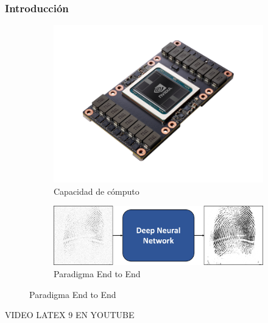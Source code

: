 \documentclass{beamer}
\begin{document}
\begin{frame}
\frametitle{Introducción}


\begin{figure}[h]

\begin{subfigure}{0.4\linewidth}
  \centering
  \includegraphics[width=\linewidth]{figs/nvidia_card.png}
  \caption{Capacidad de cómputo}
  \label{fig:sub-first}
\end{subfigure}
\begin{subfigure}{0.8\linewidth}
  \centering
  \includegraphics[width=\linewidth]{figs/end_to_end.png}
  \caption{Paradigma End to End}
  \label{fig:sub-second}
\end{subfigure}

\label{fig:fig}
\end{figure}

VIDEO LATEX 9 EN YOUTUBE

\end{frame}
\end{document}
